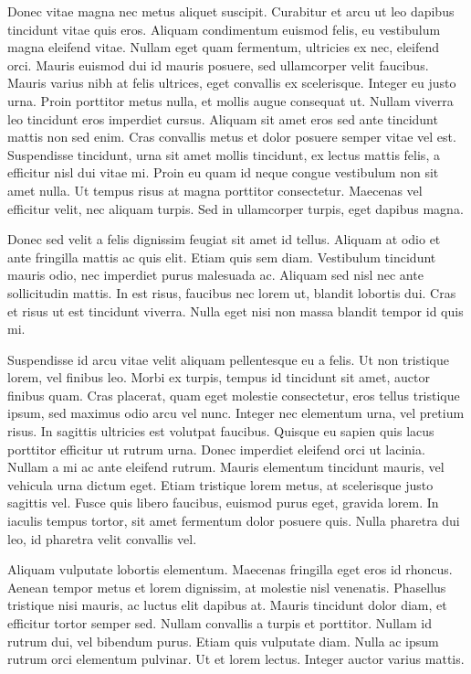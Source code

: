 \documentclass[11pt,]{article}
\begin{document}
Donec vitae magna nec metus aliquet suscipit. Curabitur et arcu ut leo
dapibus tincidunt vitae quis eros. Aliquam condimentum euismod felis, eu
vestibulum magna eleifend vitae. Nullam eget quam fermentum, ultricies
ex nec, eleifend orci. Mauris euismod dui id mauris posuere, sed
ullamcorper velit faucibus. Mauris varius nibh at felis ultrices, eget
convallis ex scelerisque. Integer eu justo urna. Proin porttitor metus
nulla, et mollis augue consequat ut. Nullam viverra leo tincidunt eros
imperdiet cursus. Aliquam sit amet eros sed ante tincidunt mattis non
sed enim. Cras convallis metus et dolor posuere semper vitae vel est.
Suspendisse tincidunt, urna sit amet mollis tincidunt, ex lectus mattis
felis, a efficitur nisl dui vitae mi. Proin eu quam id neque congue
vestibulum non sit amet nulla. Ut tempus risus at magna porttitor
consectetur. Maecenas vel efficitur velit, nec aliquam turpis. Sed in
ullamcorper turpis, eget dapibus magna.

Donec sed velit a felis dignissim feugiat sit amet id tellus. Aliquam at
odio et ante fringilla mattis ac quis elit. Etiam quis sem diam.
Vestibulum tincidunt mauris odio, nec imperdiet purus malesuada ac.
Aliquam sed nisl nec ante sollicitudin mattis. In est risus, faucibus
nec lorem ut, blandit lobortis dui. Cras et risus ut est tincidunt
viverra. Nulla eget nisi non massa blandit tempor id quis mi.

Suspendisse id arcu vitae velit aliquam pellentesque eu a felis. Ut non
tristique lorem, vel finibus leo. Morbi ex turpis, tempus id tincidunt
sit amet, auctor finibus quam. Cras placerat, quam eget molestie
consectetur, eros tellus tristique ipsum, sed maximus odio arcu vel
nunc. Integer nec elementum urna, vel pretium risus. In sagittis
ultricies est volutpat faucibus. Quisque eu sapien quis lacus porttitor
efficitur ut rutrum urna. Donec imperdiet eleifend orci ut lacinia.
Nullam a mi ac ante eleifend rutrum. Mauris elementum tincidunt mauris,
vel vehicula urna dictum eget. Etiam tristique lorem metus, at
scelerisque justo sagittis vel. Fusce quis libero faucibus, euismod
purus eget, gravida lorem. In iaculis tempus tortor, sit amet fermentum
dolor posuere quis. Nulla pharetra dui leo, id pharetra velit convallis
vel.

Aliquam vulputate lobortis elementum. Maecenas fringilla eget eros id
rhoncus. Aenean tempor metus et lorem dignissim, at molestie nisl
venenatis. Phasellus tristique nisi mauris, ac luctus elit dapibus at.
Mauris tincidunt dolor diam, et efficitur tortor semper sed. Nullam
convallis a turpis et porttitor. Nullam id rutrum dui, vel bibendum
purus. Etiam quis vulputate diam. Nulla ac ipsum rutrum orci elementum
pulvinar. Ut et lorem lectus. Integer auctor varius mattis.
\end{document}
